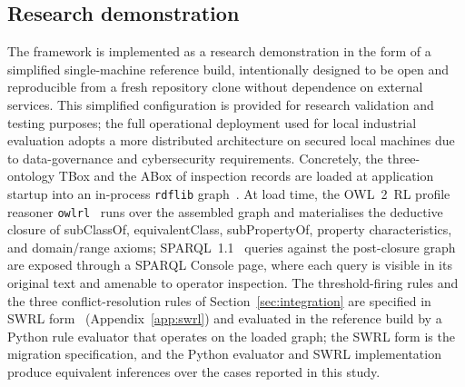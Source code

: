 \documentclass[11pt,a4paper]{article}
\begin{document}
\subsection{Research demonstration}
\label{sec:res_demo}

The framework is implemented as a research demonstration in the form of a simplified single-machine reference build, intentionally designed to be open and reproducible from a fresh repository clone without dependence on external services. This simplified configuration is provided for research validation and testing purposes; the full operational deployment used for local industrial evaluation adopts a more distributed architecture on secured local machines due to data-governance and cybersecurity requirements.
Concretely, the three-ontology TBox and the ABox of inspection records are loaded at application startup into an in-process \texttt{rdflib} graph~\citep{rdflib}.  At load time, the OWL~2~RL profile reasoner \texttt{owlrl}~\citep{owlrl} runs over the assembled graph and materialises the deductive closure of subClassOf, equivalentClass, subPropertyOf, property characteristics, and domain/range axioms; SPARQL~1.1~\citep{w3c2013sparql11} queries against the post-closure graph are exposed through a SPARQL Console page, where each query is visible in its original text and amenable to operator inspection. The threshold-firing rules and the three conflict-resolution rules of Section~\ref{sec:integration} are specified in SWRL form~\citep{horrocks2004swrl} (Appendix~\ref{app:swrl}) and evaluated in the reference build by a Python rule evaluator that operates on the loaded graph; the SWRL form is the migration specification, and the Python evaluator and SWRL implementation produce equivalent inferences over the cases reported in this study.
\end{document}
